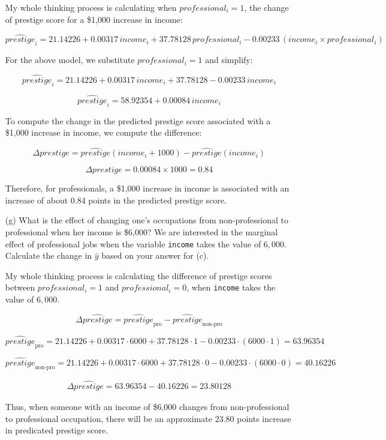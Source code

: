 \documentclass[12pt,letterpaper]{article}
\begin{document}
\begin{enumerate}
		\vspace{.3cm}
		My whole thinking process is calculating when $professional_i = 1$, the change of prestige score for a \$1,000 increase in income:
		
		\[
		\widehat{prestige}_i = 21.14226 + 0.00317 \, income_i + 37.78128 \, professional_i - 0.00233 \, (income_i \times professional_i)
		\]
		
		For the above model, we substitute $professional_i = 1$ and simplify:
		
		\[
		\widehat{prestige}_i = 21.14226 + 0.00317 \, income_i + 37.78128 - 0.00233 \, income_i
		\]
		
		\[
		\widehat{prestige}_i = 58.92354 + 0.00084 \, income_i
		\]
		
		To compute the change in the predicted prestige score associated with a \$1,000 increase in income, we compute the difference:
		
		\[
		\Delta prestige = \widehat{prestige}(income_i + 1000) - \widehat{prestige}(income_i)
		\]
		
		\[
		\Delta prestige = 0.00084 \times 1000 = 0.84
		\]
		
		Therefore, for professionals, a \$1,000 increase in income is associated with an increase of about 0.84 points in the predicted prestige score.
		
		\item [(g)] What is the effect of changing one's occupations from non-professional to professional when her income is \$6,000? We are interested in the marginal effect of professional jobs when the variable \texttt{income} takes the value of $6,000$. Calculate the change in $\hat{y}$ based on your answer for (c).
		
		\vspace{.3cm}
		My whole thinking process is calculating the difference of prestige scores between $professional_i = 1$ and $professional_i = 0$, when \texttt{income} takes the value of $6,000$.
		
		\[
		\Delta \widehat{prestige} = \widehat{prestige}_{\text{pro}} - \widehat{prestige}_{\text{non-pro}}
		\]
		
		\[
		\widehat{prestige}_{\text{pro}} = 21.14226 + 0.00317 \cdot 6000 + 37.78128 \cdot 1 - 0.00233 \cdot (6000 \cdot 1) = 63.96354
		\]
		
		\[
		\widehat{prestige}_{\text{non-pro}} = 21.14226 + 0.00317 \cdot 6000 + 37.78128 \cdot 0 - 0.00233 \cdot (6000 \cdot 0) = 40.16226
		\]
		
		\[
		\begin{aligned}
			\Delta \widehat{prestige} = 63.96354 - 40.16226 = 23.80128
		\end{aligned}
		\]
		
		Thus, when someone with an income of \$6,000 changes from non-professional to professional occupation, there will be an approximate 23.80 points increase in predicated prestige score.
		
	\end{enumerate}
	
\end{document}

